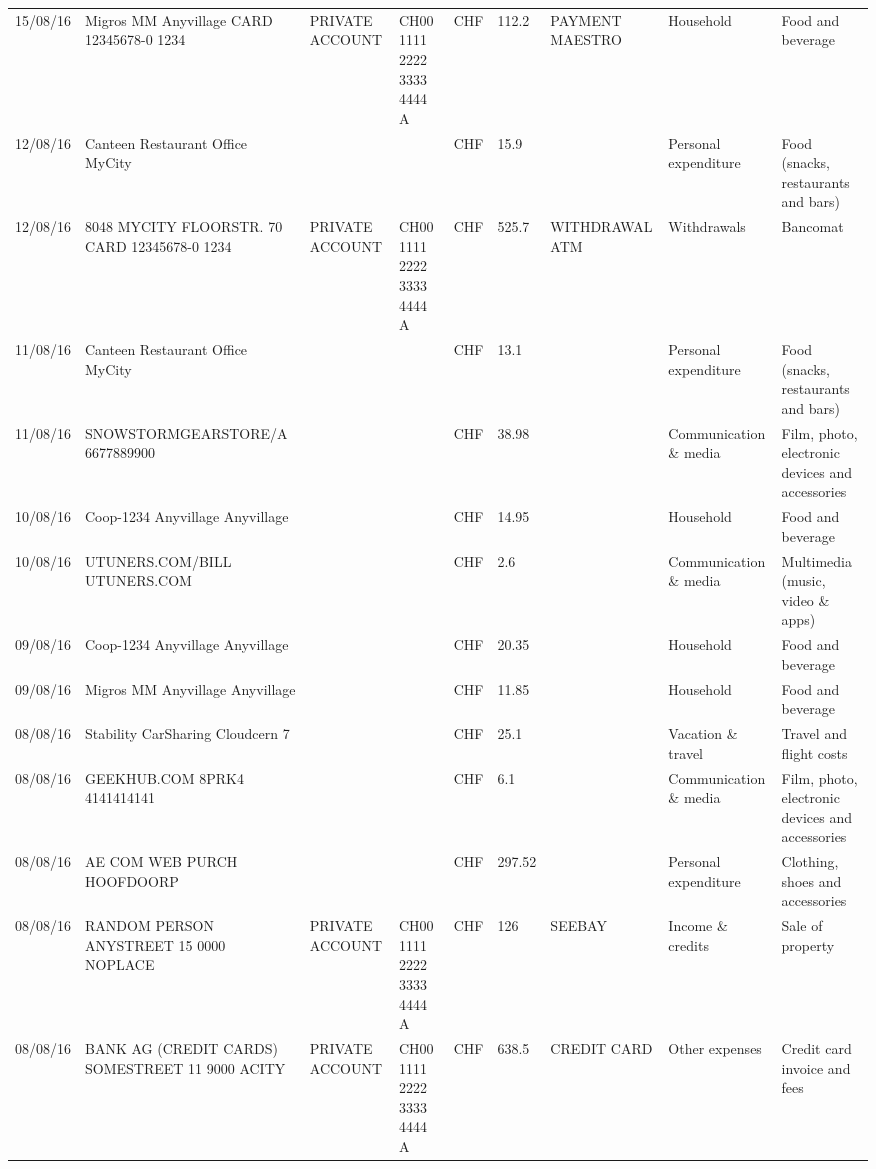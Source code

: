 \begin{landscape}
\begin{center}
\begin{longtable}{lllllllll}
		15/08/16 & Migros MM Anyvillage CARD 12345678-0 1234 & PRIVATE ACCOUNT & CH00 1111 2222 3333 4444 A & CHF   & 112.2 & PAYMENT MAESTRO & Household & Food and beverage \\
		12/08/16 & Canteen Restaurant Office      MyCity &       &       & CHF   & 15.9  &       & Personal expenditure & Food (snacks, restaurants and bars) \\
		12/08/16 & 8048 MYCITY FLOORSTR. 70 CARD 12345678-0 1234 & PRIVATE ACCOUNT & CH00 1111 2222 3333 4444 A & CHF   & 525.7 & WITHDRAWAL ATM & Withdrawals & Bancomat \\
		11/08/16 & Canteen Restaurant Office      MyCity &       &       & CHF   & 13.1  &       & Personal expenditure & Food (snacks, restaurants and bars) \\
		11/08/16 & SNOWSTORMGEARSTORE/A      6677889900 &       &       & CHF   & 38.98 &       & Communication \& media & Film, photo, electronic devices and accessories \\
		10/08/16 & Coop-1234 Anyvillage    Anyvillage &       &       & CHF   & 14.95 &       & Household & Food and beverage \\
		10/08/16 & UTUNERS.COM/BILL          UTUNERS.COM &       &       & CHF   & 2.6   &       & Communication \& media & Multimedia (music, video \& apps) \\
		09/08/16 & Coop-1234 Anyvillage    Anyvillage &       &       & CHF   & 20.35 &       & Household & Food and beverage \\
		09/08/16 & Migros MM Anyvillage    Anyvillage &       &       & CHF   & 11.85 &       & Household & Food and beverage \\
		08/08/16 & Stability CarSharing      Cloudcern 7 &       &       & CHF   & 25.1  &       & Vacation \& travel & Travel and flight costs \\
		08/08/16 & GEEKHUB.COM  8PRK4        4141414141 &       &       & CHF   & 6.1   &       & Communication \& media & Film, photo, electronic devices and accessories \\
		08/08/16 & AE COM WEB PURCH         HOOFDOORP &       &       & CHF   & 297.52 &       & Personal expenditure & Clothing, shoes and accessories \\
		08/08/16 & RANDOM PERSON ANYSTREET 15 0000 NOPLACE & PRIVATE ACCOUNT & CH00 1111 2222 3333 4444 A & CHF   & 126   & SEEBAY & Income \& credits & Sale of property \\
		08/08/16 & BANK AG (CREDIT CARDS) SOMESTREET 11 9000 ACITY & PRIVATE ACCOUNT & CH00 1111 2222 3333 4444 A & CHF   & 638.5 & CREDIT CARD & Other expenses & Credit card invoice and fees \\

\end{longtable}
\end{center}
\end{landscape}
